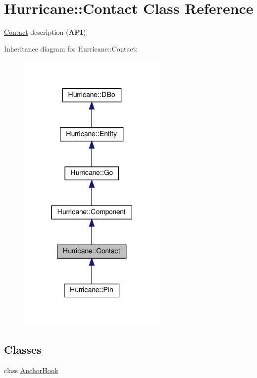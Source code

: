 \hypertarget{classHurricane_1_1Contact}{}\section{Hurricane\+:\+:Contact Class Reference}
\label{classHurricane_1_1Contact}


\mbox{\hyperlink{classHurricane_1_1Contact}{Contact}} description ({\bfseries A\+PI})  




Inheritance diagram for Hurricane\+:\+:Contact\+:\nopagebreak
\begin{figure}[H]
\begin{center}
\leavevmode
\includegraphics[width=206pt]{classHurricane_1_1Contact__inherit__graph}
\end{center}
\end{figure}
\subsection*{Classes}
\begin{DoxyCompactItemize}
\item 
class \mbox{\hyperlink{classHurricane_1_1Contact_1_1AnchorHook}{Anchor\+Hook}}
\end{DoxyCompactItemize}
